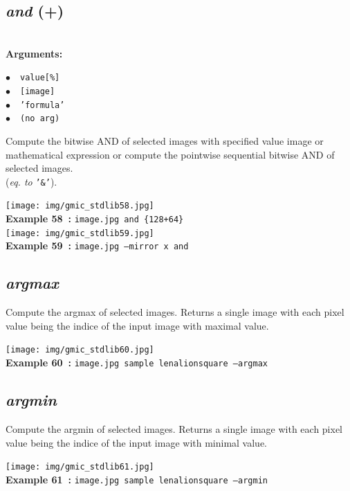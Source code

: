 \documentclass[a4paper,10.5pt,twoside]{book}
\def\comma{\discretionary{,}{}{,}}
\newcommand{\Cb}[1]{\textcolor{cb}{#1}}
\begin{document}
\subsection{\emph{and} (+)}\vspace*{-0.7em}
~\\\textbf{\Cb{Arguments: }}\begin{flushleft}
{\small \Cb{\hspace*{0.5cm}$\bullet$~~\texttt{value[\%]}}}~~~\\
{\small \Cb{\hspace*{0.5cm}$\bullet$~~\texttt{[image]}}}~~~\\
{\small \Cb{\hspace*{0.5cm}$\bullet$~~\texttt{'formula'}}}~~~\\
{\small \Cb{\hspace*{0.5cm}$\bullet$~~\texttt{(no arg)}}}\end{flushleft}
Compute the bitwise AND of selected images with specified value{\comma} image or mathematical
expression{\comma} or compute the pointwise sequential bitwise AND of selected images.
~\\(\emph{eq. to} {\small \texttt{'\&'}}).
\begin{center}\texttt{[image: img/gmic\_stdlib58.jpg]}\\
{\footnotesize \textbf{Example 58~:} \texttt{image.jpg and \{128+64\}}}
\\\texttt{[image: img/gmic\_stdlib59.jpg]}\\
{\footnotesize \textbf{Example 59~:} \texttt{image.jpg --mirror x and}}
\end{center}

\subsection{\emph{argmax} }\vspace*{-0.7em}
Compute the argmax of selected images. Returns a single image
with each pixel value being the indice of the input image with maximal value.
\begin{center}\texttt{[image: img/gmic\_stdlib60.jpg]}\\
{\footnotesize \textbf{Example 60~:} \texttt{image.jpg sample lena{\comma}lion{\comma}square --argmax}}
\end{center}

\subsection{\emph{argmin} }\vspace*{-0.7em}
Compute the argmin of selected images. Returns a single image
with each pixel value being the indice of the input image with minimal value.
\begin{center}\texttt{[image: img/gmic\_stdlib61.jpg]}\\
{\footnotesize \textbf{Example 61~:} \texttt{image.jpg sample lena{\comma}lion{\comma}square --argmin}}
\end{center}
\end{document}
